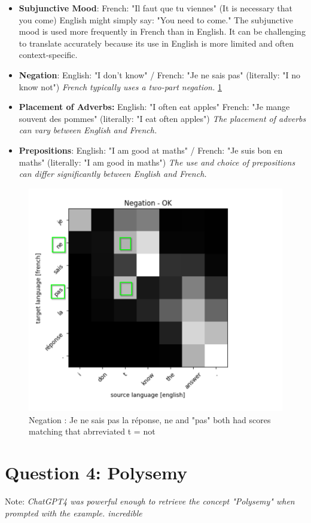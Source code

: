 \documentclass[a4paper]{article}
\begin{document}
\begin{itemize}
\item \textbf{Subjunctive Mood}:
French: "Il faut que tu viennes" (It is necessary that you come)
English might simply say: "You need to come."  The subjunctive mood is used more frequently in French than in English. It can be challenging to translate accurately because its use in English is more limited and often context-specific.
\item  \textbf{Negation}: English: "I don't know" / French: "Je ne sais pas" (literally: "I no know not") \textit{French typically uses a two-part negation.} \ref{fig:Negation}
\item  \textbf{Placement of Adverbs:} English: "I often eat apples"
French: "Je mange souvent des pommes" (literally: "I eat often apples") \textit{The placement of adverbs can vary between English and French.}
\item \textbf{Prepositions}: English: "I am good at maths" / French: "Je suis bon en maths" (literally: "I am good in maths") \textit{The use and choice of prepositions can differ significantly between English and French.}
\end{itemize}





\begin{figure}[h!]
    \centering
	\includegraphics[width=.5\textwidth]{figures/negation.png}
	\caption{Negation : Je ne sais pas la réponse, ne and "pas" both had scores matching that abrreviated t = not  \label{fig:Negation}}
\end{figure}

\newpage
\section{Question 4: Polysemy}
Note: \textit{ChatGPT4 was powerful enough to retrieve the concept "Polysemy" when prompted with the example. incredible} \\
\end{document}

